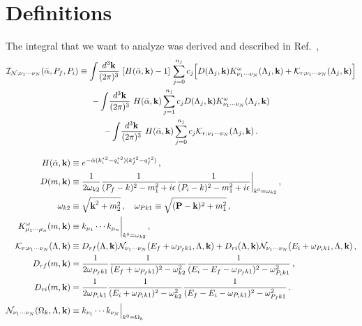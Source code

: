 \documentclass[aps,prd,onecolumn,groupedaddress]{revtex4-2}
\begin{document}
\section{Definitions}


The integral that we want to analyze was derived and described in Ref.~\cite{Baroni:2018iau},
\begin{multline}
\mathcal I_{\mathcal N;\nu_1 \cdots \nu_N}(\bar{\alpha}, P_f, P_i) \equiv     \int \! \frac{d^3 \textbf k}{(2\pi)^3} \, 
\,
 [H(\bar{\alpha}, \textbf k) - 1]
 \,
\sum_{j=0}^{n_j} c_j \Big [ D(\Lambda_j, \textbf k) K^{\omega}_{\nu_1 \cdots \nu_N}(\Lambda_j, \textbf k) +\mathcal K_{r; \nu_1 \cdots \nu_N}
(\Lambda_j, \textbf k) \Big ]  
 \\
%
 -  \int \! \frac{d^3 \textbf k}{(2\pi)^3}
 \,
     \, H(\bar{\alpha}, \textbf k)  \sum_{j=1}^{n_j}  c_j D(\Lambda_j, \textbf k) K^{\omega}_{\nu_1 \cdots \nu_N}(\Lambda_j, \textbf k)
 \\
%
 -  \int \! \frac{d^3 \textbf k}{(2\pi)^3} \, 
 \, H(\bar{\alpha}, \textbf k)   \sum_{j=0}^{n_j} c_j   \mathcal K_{r; \nu_1 \cdots \nu_N}(\Lambda_j, \textbf k)   \,.
\label{eq:INdef}
\end{multline}

\begin{align}
H( \bar \alpha, \textbf{k}) &\equiv e^{- \bar \alpha (k^{\star 2}_i - q^{\star 2}_i) (k^{\star 2}_f - q^{\star 2}_f)} \,,\\
D(m,\textbf{k})& \equiv \frac{1}{2\omega_{k2}}
\frac{1}
  {  (P_f-k)^2 - m_1^2 + i \epsilon  } 
\frac{1}
{  (P_i-k)^2 - m_1^2 + i \epsilon  }\bigg|_{k^0=\omega_{k2}}    \,,
\label{eq:D_def}
\\
\omega_{ k2} &\equiv \sqrt{ \textbf k^2 + m_2^2}\,, \quad \omega_{P k1}  \equiv \sqrt{(\textbf P -\textbf k)^2 + m_1^2} \,,\\
K^{\omega}_{\mu_1\cdots \mu_n}(m,\textbf k)  &\equiv k_{\mu_1}\cdots k_{\mu_n}  \bigg  |_{k^0=\omega_{k2}} \,,
\\
\label{eq:calKrsigma}
\mathcal K_{r;\nu_1 \cdots \nu_N}(\Lambda, \textbf k) &\equiv D_{rf}(\Lambda, \textbf k) \mathcal N_{\nu_1 \cdots \nu_N}(E_f+\omega_{P_fk1}, \Lambda, \textbf k) +  D_{ri}(\Lambda, \textbf k) \mathcal N_{\nu_1 \cdots \nu_N}(E_i+\omega_{P_i k1}, \Lambda, \textbf k)  \,,
\\
\label{eq:Drf}
D_{rf}(m, \textbf k) &=
\frac{1}{2 \omega_{P_fk1}}
\frac{1}
  { ( E_f+\omega_{P_fk1})^2 - \omega_{k2}^2  }
\frac{ 1} 
{  (E_i-E_f-\omega_{P_fk1})^2 - \omega_{P_ik1}^2   } \,, \\
\label{eq:Dri}
D_{ri}(m, \textbf k) &=
\frac{1}{2 \omega_{P_ik1}}
\frac{1}
  { ( E_i+\omega_{P_ik1})^2 - \omega_{k2}^2   } 
\frac{ 1} 
{  (E_f-E_i-\omega_{P_ik1})^2 - \omega_{P_fk1}^2   }  \,.
\\
\mathcal N_{\nu_1 \cdots \nu_N}(\Omega_k,  \Lambda, \textbf k) &\equiv   k_{\nu_1}\cdots k_{\nu_N} \Big \vert_{k^0 = \Omega_k}
\end{align}
\end{document}

